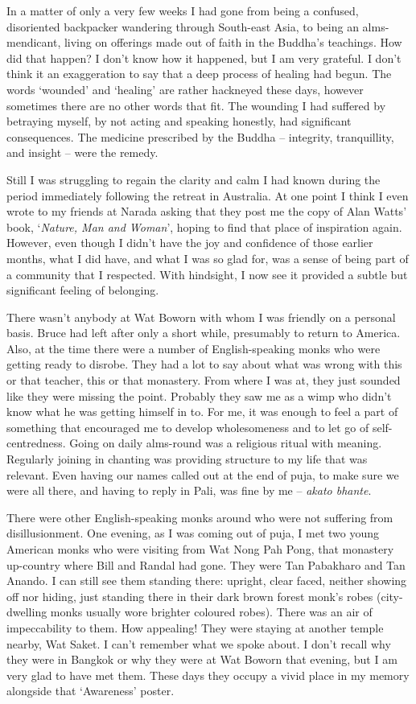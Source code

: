 In a matter of only a very few weeks I had gone from being a confused,
disoriented backpacker wandering through South-east Asia, to being an
alms-mendicant, living on offerings made out of faith in the Buddha's
teachings. How did that happen? I don't know how it happened, but I am
very grateful. I don't think it an exaggeration to say that a deep
process of healing had begun. The words `wounded' and `healing' are
rather hackneyed these days, however sometimes there are no other words
that fit. The wounding I had suffered by betraying myself, by not acting
and speaking honestly, had significant consequences. The medicine
prescribed by the Buddha -- integrity, tranquillity, and insight -- were
the remedy.

Still I was struggling to regain the clarity and calm I had known during
the period immediately following the retreat in Australia. At one point
I think I even wrote to my friends at Narada asking that they post me
the copy of Alan Watts' book, `\emph{Nature, Man and Woman}', hoping to
find that place of inspiration again. However, even though I didn't have
the joy and confidence of those earlier months, what I did have, and
what I was so glad for, was a sense of being part of a community that I
respected. With hindsight, I now see it provided a subtle but
significant feeling of belonging.

There wasn't anybody at Wat Boworn with whom I was friendly on a
personal basis. Bruce had left after only a short while, presumably to
return to America. Also, at the time there were a number of
English-speaking monks who were getting ready to disrobe. They had a lot
to say about what was wrong with this or that teacher, this or that
monastery. From where I was at, they just sounded like they were missing
the point. Probably they saw me as a wimp who didn't know what he was
getting himself in to. For me, it was enough to feel a part of something
that encouraged me to develop wholesomeness and to let go of
self-centredness. Going on daily alms-round was a religious ritual with
meaning. Regularly joining in chanting was providing structure to my
life that was relevant. Even having our names called out at the end of
puja, to make sure we were all there, and having to reply in
Pali, was fine by me -- \emph{akato bhante}.

There were other English-speaking monks around who were not suffering
from disillusionment. One evening, as I was coming out of puja, I met
two young American monks who were visiting from Wat Nong Pah Pong, that
monastery up-country where Bill and Randal had gone. They were Tan
Pabakharo and Tan Anando. I can still see them standing there: upright,
clear faced, neither showing off nor hiding, just standing there in
their dark brown forest monk's robes (city-dwelling monks usually wore
brighter coloured robes). There was an air of impeccability to them. How
appealing! They were staying at another temple nearby, Wat Saket. I
can't remember what we spoke about. I don't recall why they were in
Bangkok or why they were at Wat Boworn that evening, but I am very glad
to have met them. These days they occupy a vivid place in my memory
alongside that `Awareness' poster.

